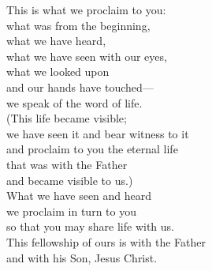 
\lettrine{T}{}his is what we proclaim to you:\\
what was from the beginning,\\
what we have heard,\\
what we have seen with our eyes,\\
what we looked upon\\
and our hands have touched—\\
we speak of the word of life.\\
(This life became visible;\\
we have seen it and bear witness to it\\
and proclaim to you the eternal life\\
that was with the Father\\
and became visible to us.)\\
What we have seen and heard\\
we proclaim in turn to you\\
so that you may share life with us.\\
This fellowship of ours is with the Father\\
and with his Son, Jesus Christ.
